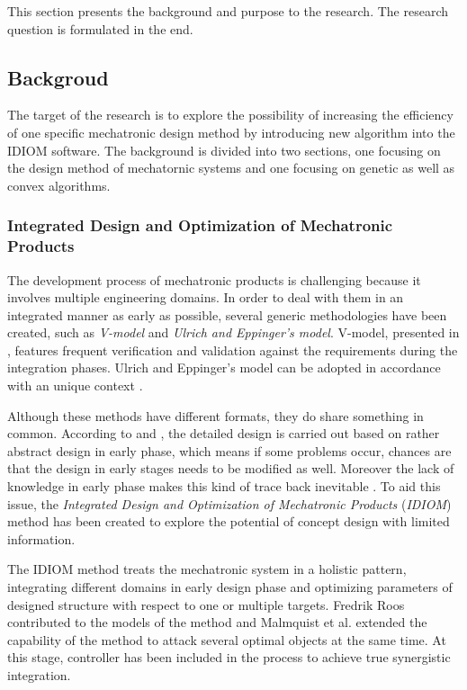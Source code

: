 This section presents the background and purpose to the research. The research question is formulated in the end.

\subsection{Backgroud}
The target of the research is to explore the possibility of increasing the efficiency of one specific mechatronic design method by introducing new algorithm into the IDIOM software. The background is divided into two sections, one focusing on the design method of mechatornic systems and one focusing on genetic as well as convex algorithms.

\subsubsection{Integrated Design and Optimization of Mechatronic Products}
The development process of mechatronic products is challenging because it involves multiple engineering domains. In order to deal with them in an integrated manner as early as possible, several generic methodologies have been created, such as \textit{V-model} and \textit{Ulrich and Eppinger's model}. V-model, presented in \cite{VDI}, features frequent verification and validation against the requirements during the integration phases. Ulrich and Eppinger's model can be adopted in accordance with an unique context \cite{Ulrich}.

Although these methods have different formats, they do share something in common. According to \cite{VDI} and \cite{Ulrich}, the detailed design is carried out based on rather abstract design in early phase, which means if some problems occur, chances are that the design in early stages needs to be modified as well. Moreover the lack of knowledge in early phase makes this kind of trace back inevitable \cite{Holistic}. To aid this issue, the \textit{Integrated Design and Optimization of Mechatronic Products} (\textit{IDIOM}) method has been created to explore the potential of concept design with limited information.

The IDIOM method treats the mechatronic system in a holistic pattern,  integrating different domains in early design phase and optimizing parameters of designed structure with respect to one or multiple targets. Fredrik Roos contributed to the models of the method \cite{Roos} and Malmquist et al. extended the capability of the method to attack several optimal objects at the same time. At this stage, controller has been included in the process to achieve true synergistic integration.

